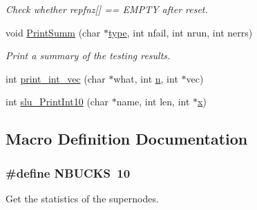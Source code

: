 \begin{DoxyCompactItemize}
\begin{DoxyCompactList}\small\item\em Check whether repfnz\mbox{[}\mbox{]} == E\+M\+P\+T\+Y after reset. \end{DoxyCompactList}\item 
void \hyperlink{scipy-0_814_80_2scipy_2sparse_2linalg_2dsolve_2SuperLU_2SRC_2util_8c_aa88c72f09a077ee18043edff386f4a2c}{Print\+Summ} (char $\ast$\hyperlink{fftw__dct_8c_a7aead736a07eaf25623ad7bfa1f0ee2d}{type}, int nfail, int nrun, int nerrs)
\begin{DoxyCompactList}\small\item\em Print a summary of the testing results. \end{DoxyCompactList}\item 
int \hyperlink{scipy-0_814_80_2scipy_2sparse_2linalg_2dsolve_2SuperLU_2SRC_2util_8c_aac67c35b47f2aa92a3202769d3eebdeb}{print\+\_\+int\+\_\+vec} (char $\ast$what, int \hyperlink{indexexpr_8h_ab427e2e2b4d6cec55fa088ea2a692ace}{n}, int $\ast$vec)
\item 
int \hyperlink{scipy-0_814_80_2scipy_2sparse_2linalg_2dsolve_2SuperLU_2SRC_2util_8c_a52adbcf3d0b17d26fa9fc133c911993d}{slu\+\_\+\+Print\+Int10} (char $\ast$name, int len, int $\ast$\hyperlink{vecnorm1_8cc_ac73eed9e41ec09d58f112f06c2d6cb63}{x})
\end{DoxyCompactItemize}


\subsection{Macro Definition Documentation}
\hypertarget{scipy-0_814_80_2scipy_2sparse_2linalg_2dsolve_2SuperLU_2SRC_2util_8c_a70f31d2c4d8d0802751120e07028bd3a}{}
\subsubsection[{N\+B\+U\+C\+K\+S}]{\setlength{\rightskip}{0pt plus 5cm}\#define N\+B\+U\+C\+K\+S~10}\label{scipy-0_814_80_2scipy_2sparse_2linalg_2dsolve_2SuperLU_2SRC_2util_8c_a70f31d2c4d8d0802751120e07028bd3a}


Get the statistics of the supernodes. 



